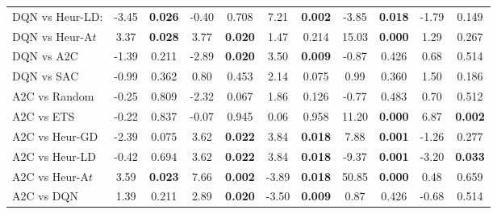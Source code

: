 \begin{tabular}{lcccccccccc}
	DQN vs Heur-LD:  & -3.45          & \textbf{0.026}         & -0.40          & 0.708                  & 7.21           & \textbf{0.002}         & -3.85          & \textbf{0.018}         & -1.79          & 0.149                  \\
	DQN vs Heur-A$t$  & 3.37           & \textbf{0.028}         & 3.77           & \textbf{0.020}         & 1.47           & 0.214                  & 15.03          & \textbf{0.000}         & 1.29           & 0.267                  \\
	DQN vs A2C       & -1.39          & 0.211                  & -2.89          & \textbf{0.020}         & 3.50           & \textbf{0.009}         & -0.87          & 0.426                  & 0.68           & 0.514                  \\
	DQN vs SAC       & -0.99          & 0.362                  & 0.80           & 0.453                  & 2.14           & 0.075                  & 0.99           & 0.360                  & 1.50           & 0.186                  \\
	\midrule 
	A2C vs Random    & -0.25          & 0.809                  & -2.32          & 0.067                  & 1.86           & 0.126                  & -0.77          & 0.483                  & 0.70           & 0.512                  \\
	A2C vs ETS       & -0.22          & 0.837                  & -0.07          & 0.945                  & 0.06           & 0.958                  & 11.20          & \textbf{0.000}         & 6.87           & \textbf{0.002}         \\
	A2C vs Heur-GD   & -2.39          & 0.075                  & 3.62           & \textbf{0.022}         & 3.84           & \textbf{0.018}         & 7.88           & \textbf{0.001}         & -1.26          & 0.277                  \\
	A2C vs Heur-LD   & -0.42          & 0.694                  & 3.62           & \textbf{0.022}         & 3.84           & \textbf{0.018}         & -9.37          & \textbf{0.001}         & -3.20          & \textbf{0.033}         \\
	A2C vs Heur-A$t$  & 3.59           & \textbf{0.023}         & 7.66           & \textbf{0.002}         & -3.89          & \textbf{0.018}         & 50.85          & \textbf{0.000}         & 0.48           & 0.659                  \\
	A2C vs DQN       & 1.39           & 0.211                  & 2.89           & \textbf{0.020}         & -3.50          & \textbf{0.009}         & 0.87           & 0.426                  & -0.68          & 0.514                  \\

\end{tabular}
